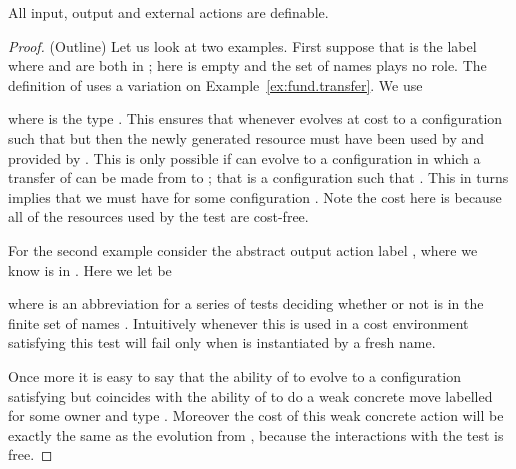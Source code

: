 \documentclass{LMCS}
\begin{document}
\begin{thm}[Definability]\label{thm:definability}
  All input, output and external actions are definable.         
\end{thm}
\begin{proof}(Outline)
  Let us look at two examples. First suppose that  is the label
 where  and  are both in ; 
here  is empty and the set of names  plays no role. 
The definition of  uses a variation on Example~\ref{ex:fund.transfer}. We use

where  is the type .  This ensures that whenever 
evolves at cost  to a configuration   such that   but 
then the newly generated resource  must have been used by  and provided by .
This is
only possible if  can evolve to a configuration in which a transfer of  can be made from
 to ; that is a configuration  such that  .
This in turns implies that we must have  for some 
configuration . Note the cost here is  because all of the resources used by the test 
are cost-free. 

For the second example consider the abstract output action label , where we know  is
in .  Here we let  be

where  is an abbreviation for a series of tests deciding whether or not  is in the finite set 
of names . Intuitively
whenever this is used in a cost environment  satisfying  this test will
fail only when  is instantiated by a fresh name.

Once more it is easy to say that the ability of  to evolve to a configuration
 satisfying  but  coincides with the ability
of  to do a weak concrete move labelled   for some owner  and type
. Moreover the cost of this weak concrete action will be exactly the same as the evolution from 
 , because the interactions with the test  is free. 
\end{proof}
\end{document}
